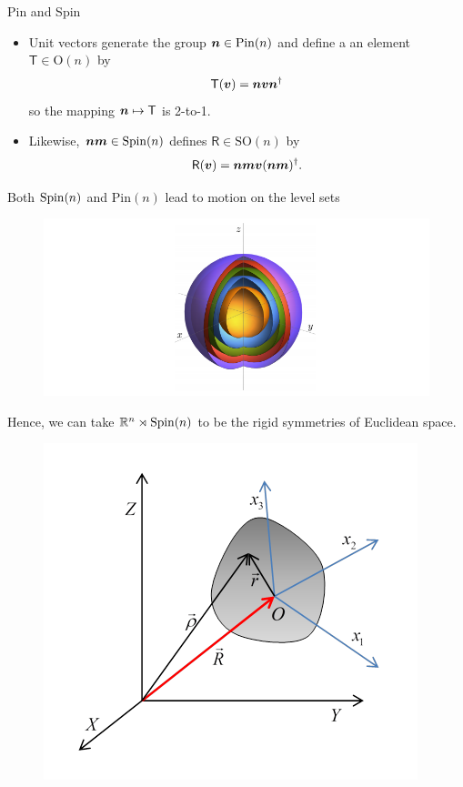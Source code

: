\documentclass[aspectratio=169]{beamer}
\begin{document}
\begin{frame}{Pin and Spin}
\vfill
\begin{itemize}
	\item Unit vectors generate the group $\boldsymbol{n}\in \mathrm{Pin}(n)$ and define a an element $\mathsf{T}\in \mathrm{O}(n)$ by
	\[
	\mathsf{T}(\boldsymbol{v}) = \boldsymbol{n} \boldsymbol{v} \boldsymbol{n}^\dagger
	\]
	so the mapping $\boldsymbol{n}\mapsto \mathsf{T}$ is 2-to-1.
	\item Likewise, $\boldsymbol{nm} \in \mathrm{Spin}(n)$ defines $\mathsf{R} \in \mathrm{SO}(n)$ by
	\[
	\mathsf{R}(\boldsymbol{v}) = \boldsymbol{nm}\boldsymbol{v}(\boldsymbol{nm})^\dagger.
	\]
\end{itemize}
\vfill
\end{frame}

\begin{frame}{}
\vfill
\centering Both $\mathrm{Spin}(n)$ and $\mathrm{Pin}(n)$ lead to motion on the level sets
\begin{figure}[H]
\centering
\includegraphics[width=.8\textwidth]{figures/euclidean.png}
\end{figure}
\end{frame}

\begin{frame}{}
\vfill
Hence, we can take $\mathbb{R}^n \rtimes \mathrm{Spin}(n)$ to be the rigid symmetries of Euclidean space.
\begin{figure}[H]
\centering
\includegraphics[width=.5\textwidth]{figures/rigid_body.png}
\end{figure} 
\vfill
\end{frame}
\end{document}
